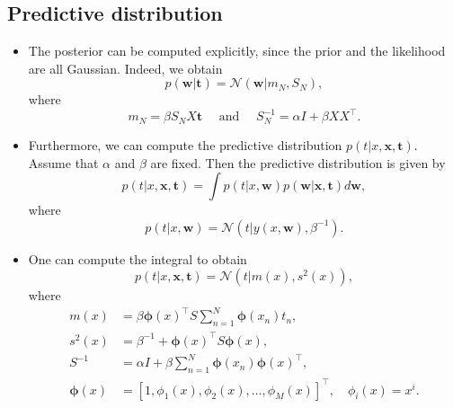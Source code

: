 \documentclass[
]{article}
\begin{document}
\hypertarget{predictive-distribution}{%
\subsection{Predictive distribution}\label{predictive-distribution}}

\begin{itemize}
\item
  The posterior can be computed explicitly, since the prior and the
  likelihood are all Gaussian. Indeed, we obtain
  \[ p({\boldsymbol{w}}|\mathbf{t}) = \mathcal N({\boldsymbol{w}}| m_N, S_N),\]
  where
  \[ m_N = \beta S_N X \mathbf{t}\quad \text{ and } \quad S_N^{-1}  = \alpha I +\beta X X^\top .\]
\item
  Furthermore, we can compute the predictive distribution
  \(p(t|x, {\boldsymbol{x}}, \mathbf{t})\). Assume that \(\alpha\) and
  \(\beta\) are fixed. Then the predictive distribution is given by
  \[ p(t|x, {\boldsymbol{x}}, \mathbf{t}) = \int p(t|x, {\boldsymbol{w}}) p({\boldsymbol{w}}| {\boldsymbol{x}}, \mathbf{t}) d{\boldsymbol{w}},  \]
  where
  \[p(t|x, {\boldsymbol{w}}) = \mathcal N(t|y(x, {\boldsymbol{w}}), \beta^{-1}).\]
\item
  One can compute the integral to obtain
  \[p(t|x, {\boldsymbol{x}}, \mathbf{t}) = \mathcal N(t| m(x), s^2(x) ),\]
  where \begin{align*}
  m(x)&= \beta \boldsymbol\phi(x)^\top S \sum_{n=1}^N \boldsymbol\phi(x_n) t_n, \\
  s^2(x) &= \beta^{-1} + \boldsymbol\phi(x)^\top S \boldsymbol\phi(x), \\
  S^{-1} &= \alpha I + \beta \sum_{n=1}^N \boldsymbol \phi(x_n) \boldsymbol\phi(x)^\top, \\
  \boldsymbol \phi(x)&=[1, \phi_1(x), \phi_2(x),  \dots , \phi_M(x)]^\top ,  \quad \phi_i(x)=x^i . 
  \end{align*}
\end{itemize}
\end{document}

